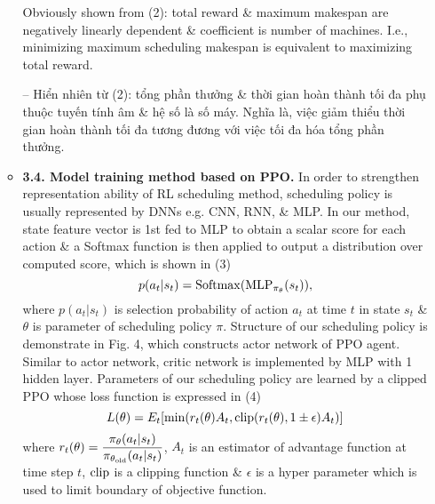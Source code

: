 \documentclass{article}
\begin{document}
\begin{itemize}
\begin{itemize}
        Obviously shown from (2): total reward \& maximum makespan are negatively linearly dependent \& coefficient is number of machines. I.e., minimizing maximum scheduling makespan is equivalent to maximizing total reward.

        -- Hiển nhiên từ (2): tổng phần thưởng \& thời gian hoàn thành tối đa phụ thuộc tuyến tính âm \& hệ số là số máy. Nghĩa là, việc giảm thiểu thời gian hoàn thành tối đa tương đương với việc tối đa hóa tổng phần thưởng.
        \item {\bf3.4. Model training method based on PPO.} In order to strengthen representation ability of RL scheduling method, scheduling policy is usually represented by DNNs e.g. CNN, RNN, \& MLP. In our method, state feature vector is 1st fed to MLP to obtain a scalar score for each action \& a Softmax function is then applied to output a distribution over computed score, which is shown in (3)
        \begin{equation*}
            p(a_t|s_t) = {\rm Softmax}({\rm MLP}_{\pi_\theta}(s_t)),
        \end{equation*}
        where $p(a_t|s_t)$ is selection probability of action $a_t$ at time $t$ in state $s_t$ \& $\theta$ is parameter of scheduling policy $\pi$. Structure of our scheduling policy is demonstrate in {\sf Fig. 4}, which constructs actor network of PPO agent. Similar to actor network, critic network is implemented by MLP with 1 hidden layer. Parameters of our scheduling policy are learned by a clipped PPO whose loss function is expressed in (4)
        \begin{equation*}
            L(\theta) = E_t[\min(r_t(\theta)A_t,{\rm clip}(r_t(\theta),1\pm\epsilon)A_t)]
        \end{equation*}
        where $r_t(\theta) = \dfrac{\pi_\theta(a_t|s_t)}{\pi_{\theta_{\rm old}}(a_t|s_t)}$, $A_t$ is an estimator of advantage function at time step $t$, ${\rm clip}$ is a clipping function \& $\epsilon$ is a hyper parameter which is used to limit boundary of objective function.


\end{itemize}
\end{itemize}
\end{document}

